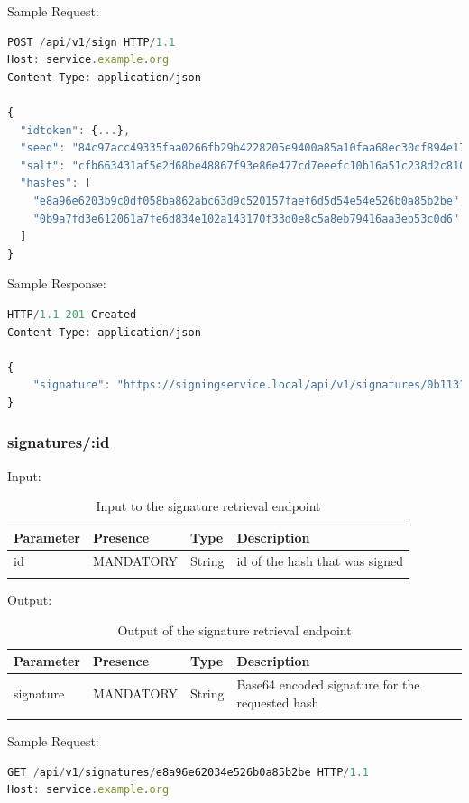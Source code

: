 Sample Request:
\begin{lstlisting}[caption={sign request}, captionpos=b, language=JavaScript, label={lst:signrequest}]
POST /api/v1/sign HTTP/1.1
Host: service.example.org
Content-Type: application/json

{
  "idtoken": {...},
  "seed": "84c97acc49335faa0266fb29b4228205e9400a85a10faa68ec30cf894e1730ed",
  "salt": "cfb663431af5e2d68be48867f93e86e477cd7eeefc10b16a51c238d2c810561b",
  "hashes": [
    "e8a96e6203b9c0df058ba862abc63d9c520157faef6d5d54e54e526b0a85b2be",
    "0b9a7fd3e612061a7fe6d834e102a143170f33d0e8c5a8eb79416aa3eb53c0d6"
  ]
}
\end{lstlisting}

Sample Response:

\begin{lstlisting}[caption={sign response}, captionpos=b, language=JavaScript, label={lst:signresponse}]
HTTP/1.1 201 Created
Content-Type: application/json

{
	"signature": "https://signingservice.local/api/v1/signatures/0b1131c417cafcc5a5f259d357903026f8e0c4f85e3ca0b68f3d55b8e32a55e8"
}
\end{lstlisting}

\subsubsection{signatures/:id}
Input:

\begin{longtable}{|l|l|l|l|}
	\hline
	\textbf{Parameter} & \textbf{Presence} & \textbf{Type} & \textbf{Description} \\ \hline
	id & MANDATORY & String & id of the hash that was signed \\ \hline
    \caption{Input to the signature retrieval endpoint}
\end{longtable}

Output:

\begin{longtable}{|l|l|l|l|}
	\hline
	\textbf{Parameter} & \textbf{Presence} & \textbf{Type} & \textbf{Description} \\ \hline
	signature & MANDATORY & String & Base64 encoded signature for the requested hash \\ \hline
	\caption{Output of the signature retrieval endpoint}
\end{longtable}

Sample Request:

\begin{lstlisting}[caption={signature request}, captionpos=b, language=JavaScript, label={lst:signaturerequest}]
GET /api/v1/signatures/e8a96e62034e526b0a85b2be HTTP/1.1
Host: service.example.org
\end{lstlisting}

